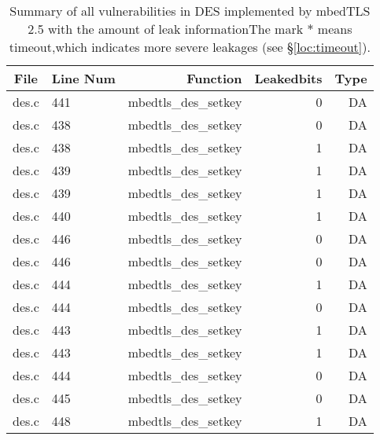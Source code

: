 \begin{table}%
\centering
\caption{Summary of all vulnerabilities in DES implemented by mbedTLS 2.5 with the amount of leak informationThe mark $*$ means timeout,which indicates more severe leakages (see \S\ref{loc:timeout}).}\label{tab:DESmbedTLS}
\begin{tabular}{clrrr}
\hline
\textbf{File} & \textbf{Line Num} & \textbf{Function} & \textbf{Leakedbits} & \textbf{Type} \\\hline
des.c& 441&mbedtls\_des\_setkey&0 &DA\\
des.c& 438&mbedtls\_des\_setkey&0 &DA\\
des.c& 438&mbedtls\_des\_setkey&1 &DA\\
des.c& 439&mbedtls\_des\_setkey&1 &DA\\
des.c& 439&mbedtls\_des\_setkey&1 &DA\\
des.c& 440&mbedtls\_des\_setkey&1 &DA\\
des.c& 446&mbedtls\_des\_setkey&0 &DA\\
des.c& 446&mbedtls\_des\_setkey&0 &DA\\
des.c& 444&mbedtls\_des\_setkey&1 &DA\\
des.c& 444&mbedtls\_des\_setkey&0 &DA\\
des.c& 443&mbedtls\_des\_setkey&1 &DA\\
des.c& 443&mbedtls\_des\_setkey&1 &DA\\
des.c& 444&mbedtls\_des\_setkey&0 &DA\\
des.c& 445&mbedtls\_des\_setkey&0 &DA\\
des.c& 448&mbedtls\_des\_setkey&1 &DA\\
\hline
\end{tabular}
\end{table}